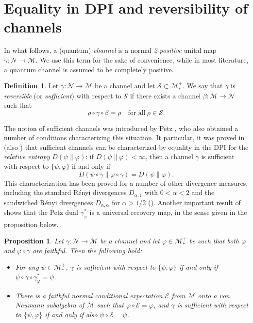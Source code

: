 \documentclass[12pt]{article}
\newtheorem{prop}[theorem]{Proposition}
\theoremstyle{definition}
\newtheorem{defi}[theorem]{Definition}
\theoremstyle{remark}
\numberwithin{equation}{section}
\def\Me{\mathcal M}
\def\Ne{\mathcal N}
\def\ffi{\varphi}
\begin{document}
\section{Equality in DPI and reversibility of channels}

In what follows, a (quantum) \emph{channel} is a normal \emph{2-positive} unital
map $\gamma: \Ne\to \Me$. We use this term for the sake of convenience, while in most literature,
a quantum channel is assumed to be completely positive.

\begin{defi} Let $\gamma:\Ne\to \Me$ be a channel and let $\mathcal S \subset
\Me_*^+$. We say that $\gamma$ is \emph{reversible} (or \emph{sufficient}) with respect to
$\mathcal S$ if there exists a channel $\beta:\Me\to \Ne$ such that
\[
\rho\circ\gamma\circ\beta=\rho\quad\mbox{for all}\ \rho\in \mathcal S.
\]
\end{defi}

The notion of sufficient channels was introduced by Petz
\cite{petz1986sufficient,petz1988sufficiency}, who also obtained a number of conditions
characterizing this situation. It particular, it was proved in \cite{petz1988sufficiency}
(also \cite{jencova2006sufficiency}) that sufficient channels can be characterized by
equality in the DPI for the \emph{relative entropy} $D(\psi\|\varphi)$: if $D(\psi\|\varphi)<\infty$,
then a channel $\gamma$ is sufficient with respect to $\{\psi,\varphi\}$ if and only if 
\[
D(\psi\circ\gamma\|\varphi\circ\gamma)=D(\psi\|\varphi). 
\]
This characterization has been proved for a number of other divergence measures, including the
standard R\'enyi divergences $D_{\alpha,1}$ with $0<\alpha<2$  and the sandwiched
R\'enyi divergences $D_{\alpha,\alpha}$ for $\alpha>1/2$
(\cite{hiai2021quantum,jencova2018renyi,jencova2021renyi}).
Another important result of \cite{petz1988sufficiency} shows that the Petz dual $\gamma_\varphi^*$
is a universal recovery map, in the sense given in the proposition below. 

\begin{prop}\label{prop:universal}
Let $\gamma:\Ne\to \Me$ be a channel and let $\varphi\in \Me_*^+$ be such that both $\ffi$ and
$\ffi\circ\gamma$ are faithful. Then the following hold:
\begin{itemize}
\item[(i)] For any $\psi\in \Me_*^+$, $\gamma$ is sufficient with respect to $\{\psi,\varphi\}$ if and only
if $\psi\circ\gamma\circ\gamma_\varphi^*=\psi$.

\item[(ii)]
There is a faithful normal conditional expectation $\mathcal E$ from $\Me$ onto a von Neumann
subalgebra of $\Me$ such that $\varphi\circ \mathcal E=\varphi$, and $\gamma$ is sufficient with
respect to $\{\psi,\varphi\}$ if and only if also $\psi\circ\mathcal E=\psi$.
\end{itemize}
\end{prop}
\end{document}

